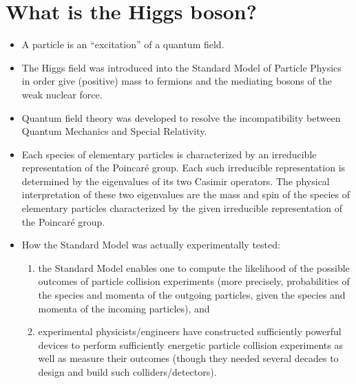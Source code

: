 

\chapter{What is the Higgs boson?}
\setcounter{theorem}{0}
\setcounter{equation}{0}


\renewcommand{\theenumi}{\roman{enumi}}
\renewcommand{\labelenumi}{\textnormal{(\theenumi)}$\;\;$}


\begin{itemize}
\item
	A particle is an ``excitation'' of a quantum field.
\item
	The Higgs field was introduced into the Standard Model of Particle Physics
	in order give (positive) mass to fermions and the mediating bosons of the
	weak nuclear force.
\item
	Quantum field theory was developed to resolve the incompatibility
	between Quantum Mechanics and Special Relativity.
\item
	Each species of elementary particles is characterized by an irreducible
	representation of the Poincaré group.
	Each such irreducible representation is determined by the eigenvalues
	of its two Casimir operators.
	The physical interpretation of these two eigenvalues are the mass and spin
	of the species of elementary particles characterized by the given
	irreducible representation of the Poincaré group.
\item
	How the Standard Model was actually experimentally tested:
	\begin{enumerate}
	\item
		the Standard Model enables one to compute the likelihood of
		the possible outcomes of particle collision experiments
		(more precisely, probabilities of the species and momenta of
		the outgoing particles, given the species and momenta
		of the incoming particles), and
	\item
		experimental physicists/engineers have constructed sufficiently
		powerful devices to perform sufficiently energetic particle collision
		experiments as well as measure their outcomes (though they
		needed several decades to design and build such colliders/detectors).
	\end{enumerate}
\end{itemize}


